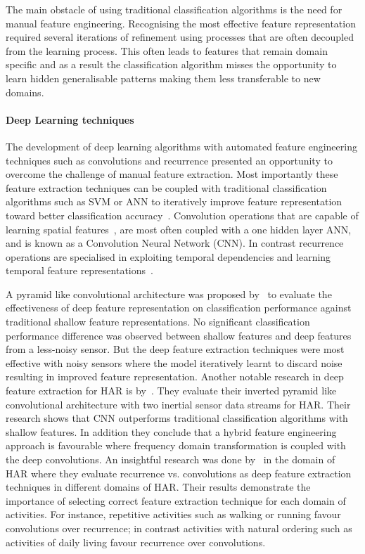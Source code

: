 \documentclass[runningheads]{llncs}
\begin{document}
The main obstacle of using traditional classification algorithms is the need for manual feature engineering. Recognising the most effective feature representation required several iterations of refinement using processes that are often decoupled from the learning process. This often leads to features that remain domain specific and as a result the classification algorithm misses the opportunity to learn hidden generalisable patterns making them less transferable to new domains. 

\paragraph{Deep Learning techniques}
The development of deep learning algorithms with automated feature engineering techniques such as convolutions and recurrence presented an opportunity to overcome the challenge of manual feature extraction. Most importantly these feature extraction techniques can be coupled with traditional classification algorithms such as SVM or ANN to iteratively improve feature representation toward better classification accuracy~\cite{sani2017learning}. Convolution operations that are capable of learning spatial features~\cite{lecun1990handwritten}, are most often coupled with a one hidden layer ANN, and is known as a Convolution Neural Network (CNN). In contrast recurrence operations are specialised in exploiting temporal dependencies and learning temporal feature representations~\cite{elman1990finding}. 

A pyramid like convolutional architecture was proposed by~\cite{sani2017learning} to evaluate the effectiveness of deep feature representation on classification performance against traditional shallow feature representations. No significant classification performance difference was observed between shallow features and deep features from a less-noisy sensor. But the deep feature extraction techniques were most effective with noisy sensors where the model iteratively learnt to discard noise resulting in improved feature representation. 
Another notable research in deep feature extraction for HAR is by~\cite{ronao2016human}. They evaluate their inverted pyramid like convolutional architecture with two inertial sensor data streams for HAR. Their research shows that CNN outperforms traditional classification algorithms with shallow features. In addition they conclude that a hybrid feature engineering approach is favourable where frequency domain transformation is coupled with the deep convolutions. 
An insightful research was done by~\cite{hammerla2016deep} in the domain of HAR where they evaluate recurrence vs. convolutions as deep feature extraction techniques in different domains of HAR. Their results demonstrate the importance of selecting correct feature extraction technique for each domain of activities. For instance, repetitive activities such as walking or running favour convolutions over recurrence; in contrast activities with natural ordering such as activities of daily living favour recurrence over convolutions. 
\end{document}
